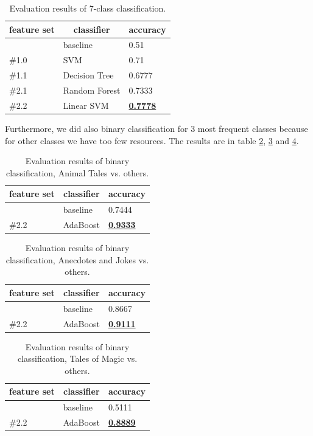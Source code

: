 \documentclass[a4paper]{article}
\begin{document}
\begin{table}[h]
\centering
\begin{tabular}{|l|l|l|}
\hline
\multicolumn{1}{|c|}{\textbf{feature set}} & \multicolumn{1}{c|}{\textbf{classifier}} & \textbf{accuracy} \\ \hline
 & baseline & 0.51 \\ \hline
\#1.0 & SVM & 0.71 \\ \hline
\#1.1 & Decision Tree & 0.6777 \\ \hline
\#2.1 & Random Forest & 0.7333 \\ \hline
\#2.2 & Linear SVM & {\ul \textbf{0.7778}} \\ \hline
\end{tabular}
\caption{Evaluation results of 7-class classification.}
\label{tab:7class}
\end{table}

Furthermore, we did also binary classification for 3 most frequent classes
because for other classes we have too few resources. The results are in
table \ref{tab:an}, \ref{tab:jokes} and \ref{tab:magic}.

\begin{table}[h]
\centering
\begin{tabular}{|l|l|l|}
\hline
\multicolumn{1}{|c|}{\textbf{feature set}} & \multicolumn{1}{c|}{\textbf{classifier}} & \textbf{accuracy} \\ \hline
 & baseline & 0.7444 \\ \hline
\#2.2 & AdaBoost & {\ul \textbf{0.9333}} \\ \hline
\end{tabular}
\caption{Evaluation results of binary classification, Animal Tales vs.
others.}
\label{tab:an}
\end{table}

\begin{table}[h]
\centering
\begin{tabular}{|l|l|l|}
\hline
\multicolumn{1}{|c|}{\textbf{feature set}} & \multicolumn{1}{c|}{\textbf{classifier}} & \textbf{accuracy} \\ \hline
 & baseline & 0.8667 \\ \hline
\#2.2 & AdaBoost & {\ul \textbf{0.9111}} \\ \hline
\end{tabular}
\caption{Evaluation results of binary classification, Anecdotes and Jokes vs.
others.}
\label{tab:jokes}
\end{table}

\begin{table}[h]
\centering
\begin{tabular}{|l|l|l|}
\hline
\multicolumn{1}{|c|}{\textbf{feature set}} & \multicolumn{1}{c|}{\textbf{classifier}} & \textbf{accuracy} \\ \hline
 & baseline & 0.5111 \\ \hline
\#2.2 & AdaBoost & {\ul \textbf{0.8889}} \\ \hline
\end{tabular}
\caption{Evaluation results of binary classification, Tales of Magic vs.
others.}
\label{tab:magic}
\end{table}
\end{document}
